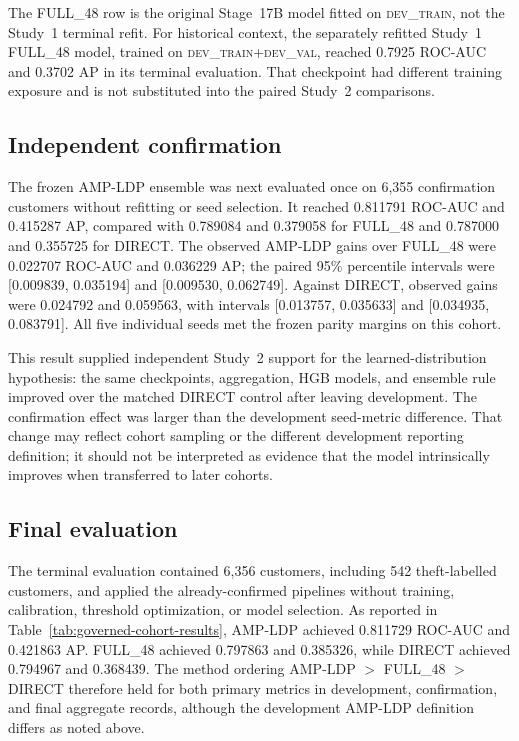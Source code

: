 The FULL\_48 row is the original Stage~17B model fitted on \textsc{dev\_train}, not the Study~1 terminal refit. For historical context, the separately refitted Study~1 FULL\_48 model, trained on \textsc{dev\_train}+\textsc{dev\_val}, reached 0.7925 ROC-AUC and 0.3702 AP in its terminal evaluation. That checkpoint had different training exposure and is not substituted into the paired Study~2 comparisons.

\subsection{Independent confirmation}

The frozen AMP-LDP ensemble was next evaluated once on 6,355 confirmation customers without refitting or seed selection. It reached 0.811791 ROC-AUC and 0.415287 AP, compared with 0.789084 and 0.379058 for FULL\_48 and 0.787000 and 0.355725 for DIRECT. The observed AMP-LDP gains over FULL\_48 were 0.022707 ROC-AUC and 0.036229 AP; the paired 95\% percentile intervals were [0.009839, 0.035194] and [0.009530, 0.062749]. Against DIRECT, observed gains were 0.024792 and 0.059563, with intervals [0.013757, 0.035633] and [0.034935, 0.083791]. All five individual seeds met the frozen parity margins on this cohort.

This result supplied independent Study~2 support for the learned-distribution hypothesis: the same checkpoints, aggregation, HGB models, and ensemble rule improved over the matched DIRECT control after leaving development. The confirmation effect was larger than the development seed-metric difference. That change may reflect cohort sampling or the different development reporting definition; it should not be interpreted as evidence that the model intrinsically improves when transferred to later cohorts.

\subsection{Final evaluation}

The terminal evaluation contained 6,356 customers, including 542 theft-labelled customers, and applied the already-confirmed pipelines without training, calibration, threshold optimization, or model selection. As reported in Table~\ref{tab:governed-cohort-results}, AMP-LDP achieved 0.811729 ROC-AUC and 0.421863 AP. FULL\_48 achieved 0.797863 and 0.385326, while DIRECT achieved 0.794967 and 0.368439. The method ordering AMP-LDP $>$ FULL\_48 $>$ DIRECT therefore held for both primary metrics in development, confirmation, and final aggregate records, although the development AMP-LDP definition differs as noted above.

